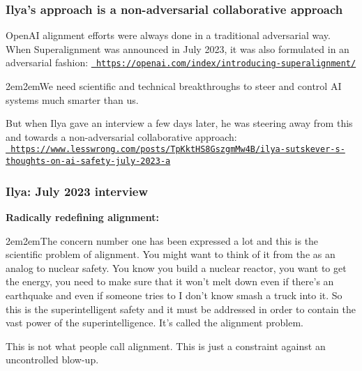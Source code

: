 \documentclass{beamer}
\newenvironment{customquote}
  {\begin{adjustwidth}{2em}{2em}\noindent\textnormal}
  {\end{adjustwidth}}
\newcommand{\msblue}[1]{{\color{myblue} #1}}
\begin{document}
\begin{frame}

  \frametitle{Ilya's approach is a non-adversarial collaborative approach}

OpenAI alignment efforts were always done in a traditional adversarial way.\\[2ex]

When Superalignment was announced in July 2023, it was also formulated
in an adversarial fashion: \href{https://openai.com/index/introducing-superalignment/}{\tt\tiny \msblue{https://openai.com/index/introducing-superalignment/}}\\[2ex]

\begin{customquote}
We need scientific and technical breakthroughs to steer and control AI systems much smarter than us.\\[2ex]
\end{customquote}

But when Ilya gave an interview a few days later, he was steering away from this and towards
a non-adversarial collaborative approach:\\[2ex]

\href{https://www.lesswrong.com/posts/TpKktHS8GszgmMw4B/ilya-sutskever-s-thoughts-on-ai-safety-july-2023-a}{\tt\tiny \msblue{https://www.lesswrong.com/posts/TpKktHS8GszgmMw4B/ilya-sutskever-s-thoughts-on-ai-safety-july-2023-a}}

\end{frame}

\begin{frame}

  \frametitle{Ilya: July 2023 interview}

{\bf Radically redefining alignment:}\\[2ex]

\begin{customquote}
The concern number one has been expressed a lot and this is the scientific problem of alignment. You might want to think of it from the as an analog to nuclear safety. You know you build a nuclear reactor, you want to get the energy, you need to make sure that it won't melt down even if there's an earthquake and even if someone tries to I don't know smash a truck into it. So this is the superintelligent safety and it must be addressed in order to contain the vast power of the superintelligence. It's called the alignment problem.\\[2ex]
\end{customquote}

This is not what people call alignment. This is just a constraint against an uncontrolled blow-up.

\end{frame}
\end{document}
